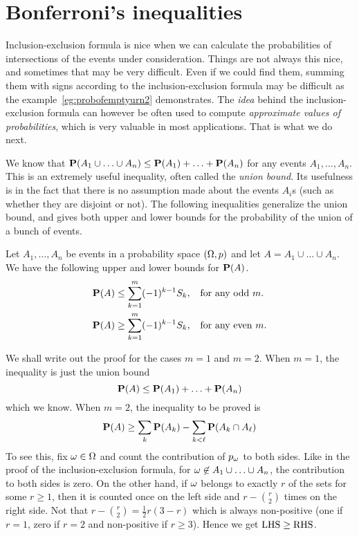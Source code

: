 \documentclass[preprint,  11pt]{amsart}
\begin{document}
\eex



\section{Bonferroni's inequalities}
Inclusion-exclusion formula is nice when we can calculate the probabilities of intersections of the events under consideration. Things are not always this nice, and sometimes that may be very difficult. Even if we could find them, summing them with signs according to the inclusion-exclusion formula may be difficult as the example~\ref{eg:probofemptyurn2} demonstrates. The {\em idea} behind the inclusion-exclusion formula can however be often used to compute {\em approximate values of probabilities}, which is very valuable in most applications. That is what we do next.


We know that $\P(A_{1}\cup \ldots \cup A_{n})\le \P(A_{1})+\ldots +\P(A_{n})$ for any events $A_{1},\ldots ,A_{n}$. This is an extremely useful inequality, often called the {\em union bound}. Its usefulness is in the fact that there is no assumption made about the events $A_{i}$s (such as whether they are disjoint or not). The following inequalities generalize the union bound, and gives both upper and lower bounds for the probability of the union of a bunch of events.

\begin{lemma}\label{lem:Bonferroni's inequalities} Let $A_{1},\ldots, A_{n}$ be events in a probability space $(\Ome,p)$ and let $A=A_{1}\cup \ldots \cup A_{n}$. We have the following upper and lower bounds for  $\P(A)$.
\begin{align*}
\P(A) &\le \sum_{k=1}^{m}(-1)^{k-1}S_{k}, \hsp{2mm} \mb{ for any odd }m. \\
\P(A) &\ge \sum_{k=1}^{m}(-1)^{k-1}S_{k}, \hsp{2mm} \mb{ for any even }m.
\end{align*}
\end{lemma}
\bprf We shall write out the proof for the cases $m=1$ and $m=2$. When $m=1$, the inequality is just the union bound
$$
 \P(A)\le \P(A_{1})+\ldots +\P(A_{n})
$$
which we know. When $m=2$, the inequality to be proved is
$$
\P(A)\ge \sum_{k}\P(A_{k})-\sum_{k<\ell}\P(A_{k}\cap A_{\ell})
$$
To see this, fix $\ome\in \Ome$ and count the contribution of $p_{\ome}$ to both sides. Like in the proof of the inclusion-exclusion formula, for $\ome \not\in A_{1}\cup\ldots \cup A_{n}$, the contribution to both sides is zero. On the other hand, if $\ome$ belongs to exactly $r$ of the sets for some $r\ge 1$, then it is counted once on the left side and $r-\binom{r}{2}$ times on the right side. Not that $r-\binom{r}{2} = \frac{1}{2}r(3-r)$ which is always non-positive (one if $r=1$, zero if $r=2$ and non-positive if $r\ge 3$). Hence we get $\mb{LHS}\ge \mb{RHS}$.
\end{document}

